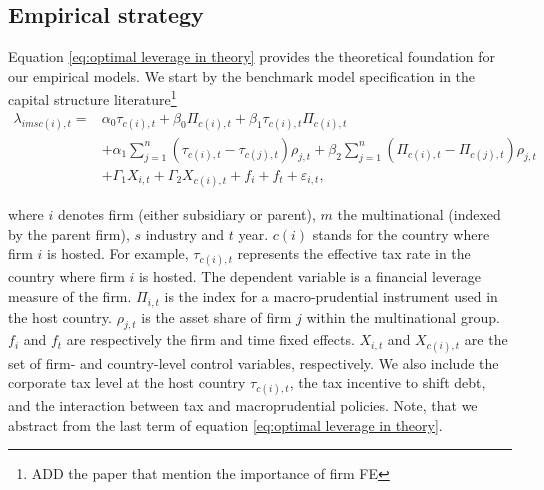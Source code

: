 \documentclass[12pt]{article}
\begin{document}
	\subsection{Empirical strategy}
	\label{subsec:empirics}
	Equation \ref{eq:optimal leverage in theory} provides the theoretical foundation for our empirical models. We start by the benchmark model specification in the capital structure literature\footnote{ADD the paper that mention the importance of firm FE} 
	\begin{equation}
	\begin{aligned}
	\lambda_{imsc(i),t}=&\alpha_0\tau_{c(i),t}+\beta_0\Pi_{c(i),t}+\beta_1\tau_{c(i),t}\Pi_{c(i),t}\\
	&+\alpha_1\sum_{j=1}^{n}(\tau_{c(i),t}-\tau_{c(j),t})\rho_{j,t}+\beta_2\sum_{j=1}^{n}(\Pi_{c(i),t}-\Pi_{c(j),t})\rho_{j,t}\\
	&+\Gamma_1 X_{i,t}+\Gamma_2 X_{c(i),t}+f_{i}+f_{t}+\varepsilon_{i,t},
	\label{eq:optimal leverage empirically 1}
	\end{aligned}
	\end{equation}
	
	where $i$ denotes firm (either subsidiary or parent), $m$ the multinational (indexed by the parent firm), $s$ industry and $t$ year. $c(i)$ stands for the country where firm $i$ is hosted. For example, $\tau_{c(i),t}$ represents the effective tax rate in the country where firm $i$ is hosted. The dependent variable is a financial leverage measure of the firm. $\Pi_{i,t}$ is the index for a macro-prudential instrument used in the host country. $\rho_{j,t}$ is the asset share of firm $j$ within the multinational group. $f_{i}$ and $f_{t}$ are respectively the firm and time fixed effects. $X_{i,t}$ and $X_{c(i),t}$ are the set of firm- and country-level control variables, respectively. We also include the corporate tax level at the host country $\tau_{c(i),t}$, the tax incentive to shift debt, and the interaction between tax and macroprudential policies. Note, that we abstract from the last term of equation \ref{eq:optimal leverage in theory}. 
	
\end{document}
